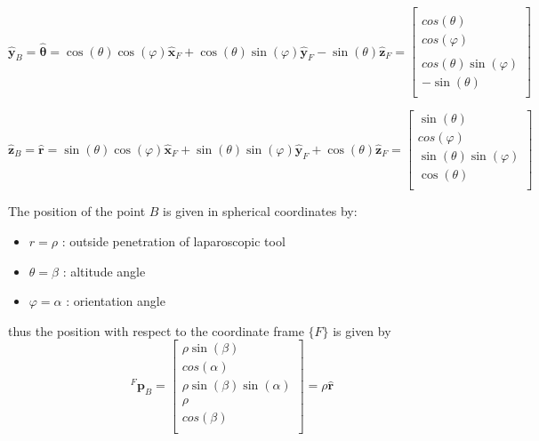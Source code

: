 \begin{equation}
\hat{\mathbf{y}}^{}_B = \hat{\mathbf{θ}} = \cos(θ)\cos(φ)\hat{\mathbf{x}}^{}_F + \cos(θ)\sin(φ)\hat{\mathbf{y}}^{}_F - \sin(θ)\hat{\mathbf{z}}^{}_F
= \begin{bmatrix}
\\cos(θ)\\cos(φ) \\
\\cos(θ)\sin(φ) \\
- \sin(θ) \\
\end{bmatrix}
\end{equation}

\begin{equation}
\hat{\mathbf{z}}^{}_B = \hat{\mathbf{r}} = \sin(θ)\cos(φ)\hat{\mathbf{x}}^{}_F + \sin(θ)\sin(φ)\hat{\mathbf{y}}^{}_F + \cos(θ)\hat{\mathbf{z}}^{}_F
= \begin{bmatrix}
\sin(θ)\\cos(φ) \\
\sin(θ)\sin(φ) \\
\cos(θ) \\
\end{bmatrix}
\end{equation}

The position of the point $B$ is given in spherical coordinates by:
\begin{itemize}
	\item $r=ρ$ : outside penetration of laparoscopic tool
	\item $θ=β$ : altitude angle
	\item $φ=α$ : orientation angle
\end{itemize}
thus the position with respect to the coordinate frame $\lbrace F \rbrace$ is given by
\begin{equation}
{}^{F}\mathbf{p}^{}_B = \begin{bmatrix}
ρ\sin(β)\\cos(α) \\
ρ\sin(β)\sin(α) \\
ρ\\cos(β) \\
\end{bmatrix} = ρ \hat{\mathbf{r}}
\end{equation}

